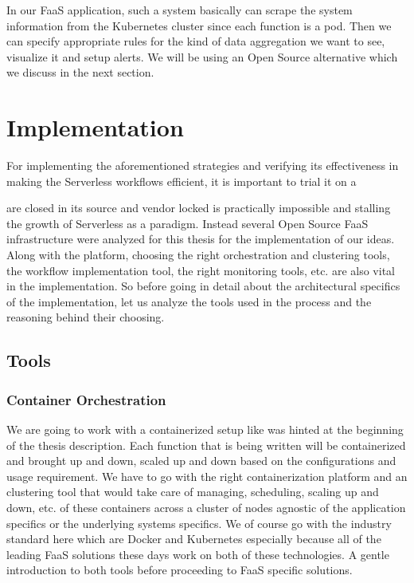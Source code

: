 \documentclass[12pt,titlepage]{article}
\begin{document}
In our FaaS application, such a system basically can scrape the system
information from the Kubernetes cluster since each function is a pod. Then we
can specify appropriate rules for the kind of data aggregation we want to see,
visualize it and setup alerts. We will be using an Open Source alternative
which we discuss in the next section.


\section{Implementation}
\label{sec:org651c074}
For implementing the aforementioned strategies and verifying its effectiveness
in making the Serverless workflows efficient, it is important to trial it on a

are closed in its source and vendor locked is practically impossible and
stalling the growth of Serverless as a paradigm. Instead several Open Source
FaaS infrastructure were analyzed for this thesis for the implementation of our
ideas. Along with the platform, choosing the right orchestration and clustering tools, the
workflow implementation tool, the right monitoring tools, etc. are also vital in
the implementation. So before going in detail about the architectural specifics
of the implementation, let us analyze the tools used in the process and the
reasoning behind their choosing.

\subsection{Tools}
\label{sec:orgea99b7f}
\subsubsection{Container Orchestration}
\label{sec:org1dec065}
We are going to work with a containerized setup like was hinted at the beginning
of the thesis description. Each function that is being written will be
containerized and brought up and down, scaled up and down based on the
configurations and usage requirement. We have to go with the right
containerization platform and an clustering tool that would take care of
managing, scheduling, scaling up and down, etc. of these containers across a
cluster of nodes agnostic of the application specifics or the underlying systems
specifics. We of course go with the industry standard here which are Docker and
Kubernetes especially because all of the leading FaaS solutions these days work
on both of these technologies. A gentle introduction to both tools before
proceeding to FaaS specific solutions.
\end{document}
